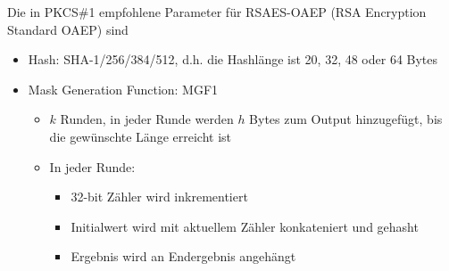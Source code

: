 \noindent Die in PKCS\#1 empfohlene Parameter für RSAES-OAEP (RSA Encryption Standard OAEP) sind 
\begin{itemize}
    \item Hash: SHA-1/256/384/512, d.h. die Hashlänge ist 20, 32, 48 oder 64 Bytes
    \item Mask Generation Function: MGF1
    \begin{itemize}
        \item $k$ Runden, in jeder Runde werden $h$ Bytes zum Output hinzugefügt, bis die gewünschte Länge erreicht ist
        \item In jeder Runde:
        \begin{itemize}
            \item 32-bit Zähler wird inkrementiert
            \item Initialwert wird mit aktuellem Zähler konkateniert und gehasht
            \item Ergebnis wird an Endergebnis angehängt
        \end{itemize}
    \end{itemize}
\end{itemize}
